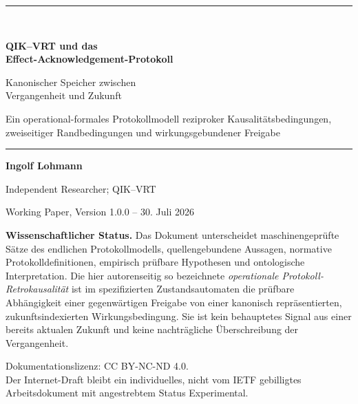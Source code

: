 \documentclass[11pt,a4paper]{article}
\theoremstyle{remark}
\newcommand{\statusbox}[2]{%
  \par\medskip\noindent
  \colorbox{#1}{\parbox{\dimexpr\linewidth-2\fboxsep\relax}{#2}}%
  \par\medskip
}
\begin{document}
\hypersetup{pageanchor=false}
\begin{titlepage}
  \thispagestyle{empty}
  \vspace*{13mm}
  {\color{QBlue}\rule{\textwidth}{1.4pt}}\\[1.1em]
  {\Huge\bfseries QIK--VRT und das\\[0.15em]
  Effect-Acknowledgement-Protokoll\par}
  \vspace{0.75em}
  {\LARGE Kanonischer Speicher zwischen\\
  Vergangenheit und Zukunft\par}
  \vspace{0.9em}
  {\Large Ein operational-formales Protokollmodell reziproker Kausalitätsbedingungen,\\
  zweiseitiger Randbedingungen und wirkungsgebundener Freigabe\par}
  \vspace{1.1em}
  {\color{QBlue}\rule{\textwidth}{0.6pt}}

  \vfill
  {\large\textbf{Ingolf Lohmann}\par}
  \vspace{0.35em}
  {\normalsize Independent Researcher; QIK--VRT\par}
  \vspace{0.35em}
  {\normalsize Working Paper, Version 1.0.0 -- 30. Juli 2026\par}

  \vfill
  \statusbox{QLight}{
    \textbf{Wissenschaftlicher Status.}
    Das Dokument unterscheidet maschinengeprüfte Sätze des endlichen
    Protokollmodells, quellengebundene Aussagen, normative
    Protokolldefinitionen, empirisch prüfbare Hypothesen und ontologische
    Interpretation. Die hier autorenseitig so bezeichnete
    \emph{operationale Protokoll-Retrokausalität} ist im spezifizierten
    Zustandsautomaten die prüfbare Abhängigkeit einer gegenwärtigen Freigabe von einer
    kanonisch repräsentierten, zukunftsindexierten Wirkungsbedingung. Sie ist
    kein behauptetes Signal aus einer bereits aktualen Zukunft und keine
    nachträgliche Überschreibung der Vergangenheit.
  }

  \vfill
  {\small
    Dokumentationslizenz: CC BY-NC-ND 4.0.\\
    Der Internet-Draft bleibt ein individuelles, nicht vom IETF
    gebilligtes Arbeitsdokument mit angestrebtem Status Experimental.
  }
\end{titlepage}
\hypersetup{pageanchor=true}
\setcounter{page}{1}
\end{document}
